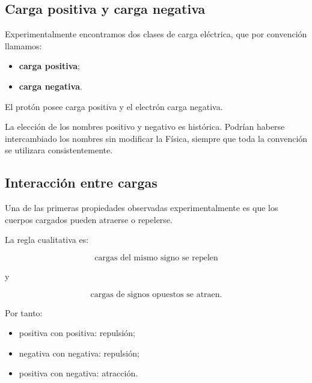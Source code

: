 
\subsection{Carga positiva y carga negativa}

Experimentalmente encontramos dos clases de carga eléctrica, que por
convención llamamos:

\begin{itemize}
    \item \textbf{carga positiva};
    \item \textbf{carga negativa}.
\end{itemize}

El protón posee carga positiva y el electrón carga negativa.

La elección de los nombres positivo y negativo es histórica. Podrían haberse
intercambiado los nombres sin modificar la Física, siempre que toda la
convención se utilizara consistentemente.



\subsection{Interacción entre cargas}

Una de las primeras propiedades observadas experimentalmente es que los
cuerpos cargados pueden atraerse o repelerse.

La regla cualitativa es:

\begin{equation}
    \boxed{
    \text{cargas del mismo signo se repelen}
    }
\end{equation}

y

\begin{equation}
    \boxed{
    \text{cargas de signos opuestos se atraen}
    }.
\end{equation}

Por tanto:

\begin{itemize}
    \item positiva con positiva: repulsión;
    \item negativa con negativa: repulsión;
    \item positiva con negativa: atracción.
\end{itemize}

